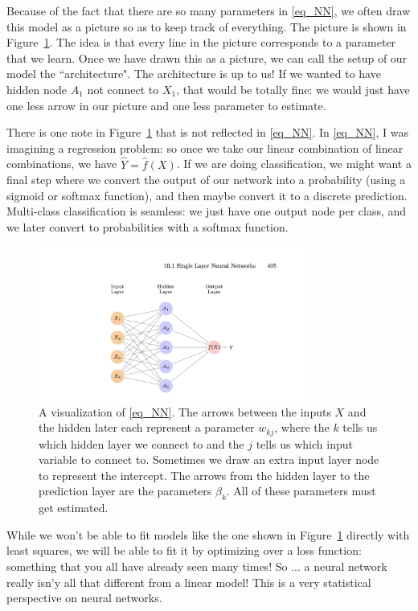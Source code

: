 Because of the fact that there are so many parameters in \eqref{eq_NN}, we often draw this model as a picture so as to keep track of everything. The picture is shown in Figure~\ref{fig_nn}. The idea is that every line in the picture corresponds to a parameter that we learn. Once we have drawn this as a picture, we can call the setup of our model the ``architecture". The architecture is up to us! If we wanted to have hidden node $A_1$ not connect to $X_1$, that would be totally fine: we would just have one less arrow in our picture and one less parameter to estimate. 

There is one note in Figure~\ref{fig_nn} that is not reflected in \eqref{eq_NN}. In \eqref{eq_NN}, I was imagining a regression problem: so once we take our linear combination of linear combinations, we have $\hat{Y} = \hat{f}(X)$. If we are doing classification, we might want a final step where we convert the output of our network into a probability (using a sigmoid or softmax function), and then maybe convert it to a discrete prediction. Multi-class classification is seamless: we just have one output node per class, and we later convert to probabilities with a softmax function. 

\begin{figure}[h]
\centering
\includegraphics[width=0.8\textwidth]{442_lecs/nn.png}
\caption{A visualization of \eqref{eq_NN}. The arrows between the inputs $X$ and the hidden later each represent a parameter $w_{kj}$, where the $k$ tells us which hidden layer we connect to and the $j$ tells us which input variable to connect to. Sometimes we draw an extra input layer node to represent the intercept. The arrows from the hidden layer to the prediction layer are the parameters $\beta_k$. All of these parameters must get estimated.}
\label{fig_nn}
\end{figure}

While we won't be able to fit models like the one shown in Figure~\ref{fig_nn} directly with least squares, we will be able to fit it by optimizing over a loss function: something that you all have already seen many times! So ... a neural network really isn'y all that different from a linear model! This is a very statistical perspective on neural networks.

